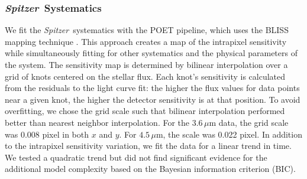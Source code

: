 \documentclass[twocolumn]{aastex61}
\newcommand{\project}[1]{\textsl{#1}}
\newcommand{\Spitzer}{\project{Spitzer}}
\begin{document}
\subsubsection{\Spitzer\ Systematics}
We fit the \Spitzer\ systematics with the POET pipeline, which uses the BLISS mapping technique \citep{stevenson12}. This approach creates a map of the intrapixel sensitivity while simultaneously fitting for other systematics and the physical parameters of the system. The sensitivity map is determined by bilinear interpolation over a grid of knots centered on the stellar flux. Each knot's sensitivity is calculated from the residuals to the light curve fit: the higher the flux values for data points near a given knot, the higher the detector sensitivity is at that position.  To avoid overfitting, we chose the grid scale such that bilinear interpolation performed better than nearest neighbor interpolation. For the $3.6\,\mu$m data, the grid scale was 0.008 pixel in both $x$ and $y$. For $4.5\,\mu$m, the scale was 0.022 pixel.  In addition to the intrapixel sensitivity variation, we fit the data for a linear trend in time. We tested a quadratic trend but did not find significant evidence for the additional model complexity based on the Bayesian information criterion (BIC). 

\end{document}

